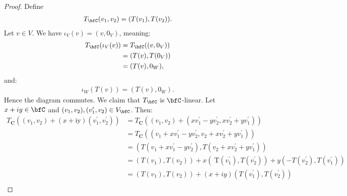         \begin{proof}
            Define 
                \begin{equation*}
                \begin{split}
                    T_\bfC(v_1,v_2) = (T(v_1),T(v_2)).
                \end{split}
                \end{equation*}
            Let $v \in V$. We have $\iota_V(v) = (v,0_V)$, meaning:
                \begin{equation*}
                \begin{split}
                    T_\bfC(\iota_V(v)) 
                    &= T_\bfC((v,0_V)) \\
                    & = (T(v),T(0_V)) \\
                    & = (T(v),0_W),
                \end{split}
                \end{equation*}
            and:
                \begin{equation*}
                \begin{split}
                    \iota_W(T(v)) = (T(v),0_W).
                \end{split}
                \end{equation*}
            Hence the diagram commutes. We claim that $T_\bfC$ is $\bfC$-linear. Let $x+iy \in \bfC$ and $(v_1,v_2),(v_1',v_2
            ) \in V_\bfC$. Then:
                \begin{equation*}
                \begin{aligned}
                T_{\mathbf{C}}\left(\left(v_1, v_2\right)+(x+\mathrm{iy})\left(v_1^{\prime}, v_2^{\prime}\right)\right) & =T_{\mathbf{C}}\left(\left(v_1, v_2\right)+\left(x v_1^{\prime}-y v_2^{\prime}, x v_2^{\prime}+y v_1^{\prime}\right)\right) \\
                & =T_{\mathbf{C}}\left(\left(v_1+x v_1^{\prime}-y v_2^{\prime}, v_2+x v_2^{\prime}+y v_1^{\prime}\right)\right) \\
                & =\left(T\left(v_1+x v_1^{\prime}-y v_2^{\prime}\right), T\left(v_2+x v_2^{\prime}+y v_1^{\prime}\right)\right) \\
                & =\left(T\left(v_1\right), T\left(v_2\right)\right)+x\left(\mathrm{~T}\left(v_1^{\prime}\right), T\left(v_2^{\prime}\right)\right)+y\left(-T\left(v_2^{\prime}\right), T\left(v_1^{\prime}\right)\right) \\
                & =\left(T\left(v_1\right), T\left(v_2\right)\right)+(x+i y)\left(T\left(v_1^{\prime}\right), T\left(v_2^{\prime}\right)\right) \\

\end{aligned}
\end{equation*}
\end{proof}
